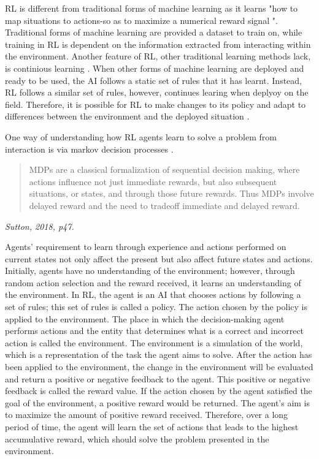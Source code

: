 RL is different from traditional forms of machine learning as it learns "how to map situations to actions-so as to maximize a numerical reward signal \cite{Sutton1}". Traditional forms of machine learning are provided a dataset to train on, while training in RL is dependent on the information extracted from interacting within the environment. Another feature of RL, other traditional learning methods lack, is continious learning \cite{sreenivas2022safe}. When other forms of machine learning are deployed and ready to be used, the AI follows a static set of rules that it has learnt. Instead, RL follows a similar set of rules, however, continues learing when deplyoy on the field. Therefore, it is possible for RL to make changes to its policy and adapt to differences between the environment and the deployed situation \cite{sreenivas2022safe}.

One way of understanding how RL agents learn to solve a problem from interaction is via markov decision processes \cite{Sutton1}.

\begin{quote}
MDPs are a classical formalization of sequential decision making,
where actions influence not just immediate rewards, but also subsequent situations, or
states, and through those future rewards. Thus MDPs involve delayed reward and the
need to tradeoff immediate and delayed reward.
\end{quote}
\hspace*{\fill} \textit{Sutton, 2018, p47.}

Agents' requirement to learn through experience and actions performed on current states not only affect the present but also affect future states and actions. Initially, agents have no understanding of the environment; however, through random action selection and the reward received, it learns an understanding of the environment. In RL, the agent is an AI that chooses actions by following a set of rules; this set of rules is called a policy. The action chosen by the policy is applied to the environment. The place in which the decision-making agent performs actions and the entity that determines what is a correct and incorrect action is called the environment. The environment is a simulation of the world, which is a representation of the task the agent aims to solve. After the action has been applied to the environment, the change in the environment will be evaluated and return a positive or negative feedback to the agent. This positive or negative feedback is called the reward value. If the action chosen by the agent satisfied the goal of the environment, a positive reward would be returned. The agent’s aim is to maximize the amount of positive reward received. Therefore, over a long period of time, the agent will learn the set of actions that leads to the highest accumulative reward, which should solve the problem presented in the environment. 

